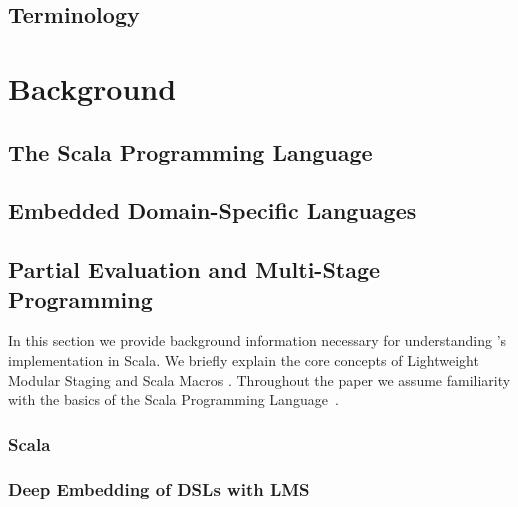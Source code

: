 \section{Terminology}
\label{sec:terminology}



\chapter{Background}
\label{ch:background}

\section{The Scala Programming Language}
\section{Embedded Domain-Specific Languages}
\section{Partial Evaluation and Multi-Stage Programming}

In this section we provide background information necessary for understanding \yy's
implementation in Scala. We briefly explain the core concepts of Lightweight Modular Staging
\cite{rompf_lightweight_2012,rompf_optimizing_2013} and Scala Macros
\cite{burmako_scala_2013}. Throughout the paper we assume familiarity with
the basics of the Scala Programming Language~\cite{odersky_scala_2004}.
\subsection{Scala}
\subsection{Deep Embedding of DSLs with LMS}
\label{subsec:deep-embedding}

